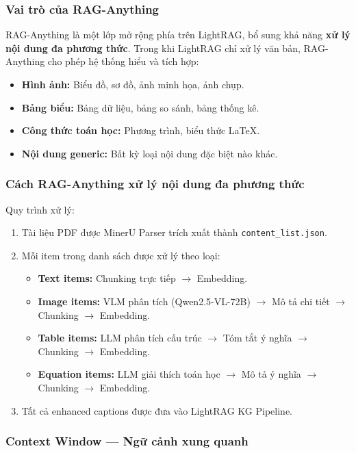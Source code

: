 \documentclass[12pt,a4paper]{article}
\begin{document}
\subsubsection{Vai trò của RAG-Anything}

RAG-Anything là một lớp mở rộng phía trên LightRAG, bổ sung khả năng \textbf{xử lý nội dung đa phương thức}. Trong khi LightRAG chỉ xử lý văn bản, RAG-Anything cho phép hệ thống hiểu và tích hợp:

\begin{itemize}
  \item \textbf{Hình ảnh:} Biểu đồ, sơ đồ, ảnh minh họa, ảnh chụp.
  \item \textbf{Bảng biểu:} Bảng dữ liệu, bảng so sánh, bảng thống kê.
  \item \textbf{Công thức toán học:} Phương trình, biểu thức LaTeX.
  \item \textbf{Nội dung generic:} Bất kỳ loại nội dung đặc biệt nào khác.
\end{itemize}

\subsubsection{Cách RAG-Anything xử lý nội dung đa phương thức}

Quy trình xử lý:

\begin{enumerate}
  \item Tài liệu PDF được MinerU Parser trích xuất thành \texttt{content\_list.json}.
  \item Mỗi item trong danh sách được xử lý theo loại:
    \begin{itemize}
      \item \textbf{Text items:} Chunking trực tiếp $\to$ Embedding.
      \item \textbf{Image items:} VLM phân tích (Qwen2.5-VL-72B) $\to$ Mô tả chi tiết $\to$ Chunking $\to$ Embedding.
      \item \textbf{Table items:} LLM phân tích cấu trúc $\to$ Tóm tắt ý nghĩa $\to$ Chunking $\to$ Embedding.
      \item \textbf{Equation items:} LLM giải thích toán học $\to$ Mô tả ý nghĩa $\to$ Chunking $\to$ Embedding.
    \end{itemize}
  \item Tất cả enhanced captions được đưa vào LightRAG KG Pipeline.
\end{enumerate}

\subsubsection{Context Window --- Ngữ cảnh xung quanh}
\end{document}
